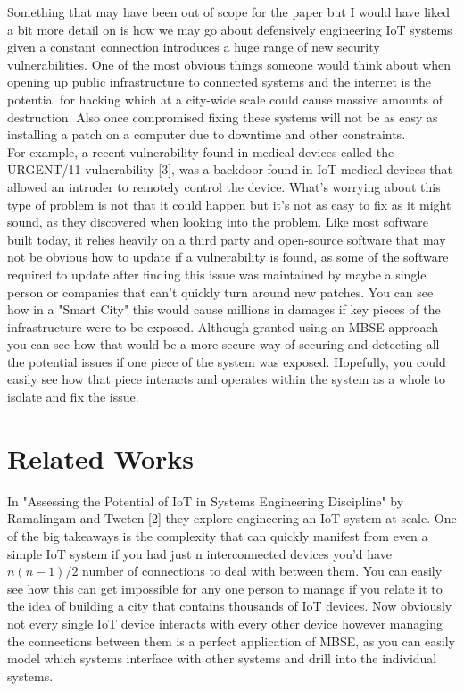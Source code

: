 \documentclass[11pt]{asme2ej}
\begin{document}
Something that may have been out of scope for the paper but I would have liked a bit more detail on is how we may go about defensively engineering IoT systems given a constant connection introduces a huge range of new security vulnerabilities.
One of the most obvious things someone would think about when opening up public infrastructure to connected systems and the internet is the potential for hacking which at a city-wide scale could cause massive amounts of destruction.
Also once compromised fixing these systems will not be as easy as installing a patch on a computer due to downtime and other constraints.\\

For example, a recent vulnerability found in medical devices called the URGENT/11 vulnerability [3], was a backdoor found in IoT medical devices that allowed an intruder to remotely control the device.
What's worrying about this type of problem is not that it could happen but it's not as easy to fix as it might sound, as they discovered when looking into the problem.
Like most software built today, it relies heavily on a third party and open-source software that may not be obvious how to update if a vulnerability is found, as some of the software required to update after finding this issue was maintained by maybe a single person or companies that can't quickly turn around new patches.
You can see how in a "Smart City" this would cause millions in damages if key pieces of the infrastructure were to be exposed.
Although granted using an MBSE approach you can see how that would be a more secure way of securing and detecting all the potential issues if one piece of the system was exposed.
Hopefully, you could easily see how that piece interacts and operates within the system as a whole to isolate and fix the issue.


\section{Related Works}

In "Assessing the Potential of IoT in Systems Engineering Discipline" by Ramalingam and Tweten [2] they explore engineering an IoT system at scale. 
One of the big takeaways is the complexity that can quickly manifest from even a simple IoT system if you had just n interconnected devices you'd have $n(n - 1)/2$ number of connections to deal with between them.
You can easily see how this can get impossible for any one person to manage if you relate it to the idea of building a city that contains thousands of IoT devices.
Now obviously not every single IoT device interacts with every other device however managing the connections between them is a perfect application of MBSE, as you can easily model which systems interface with other systems and drill into the individual systems.\\
\end{document}
